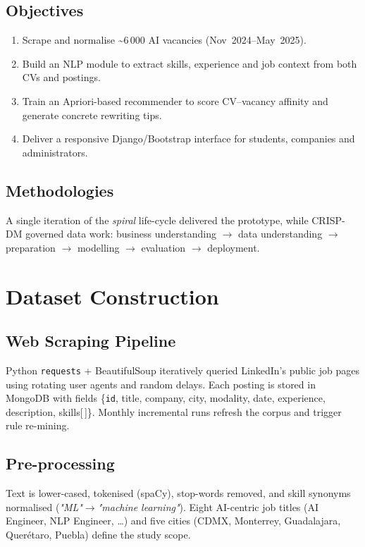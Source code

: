 \documentclass[runningheads]{llncs}
\begin{document}
	\subsection{Objectives}
	\begin{enumerate}[label=\alph*)]
		\item Scrape and normalise \textasciitilde6\,000 AI vacancies (Nov~2024–May~2025).
		\item Build an NLP module to extract skills, experience and job context from both CVs and postings.
		\item Train an Apriori-based recommender to score CV–vacancy affinity and generate concrete rewriting tips.
		\item Deliver a responsive Django/Bootstrap interface for students, companies and administrators.
	\end{enumerate}
	
	\subsection{Methodologies}
	A single iteration of the \emph{spiral} life-cycle delivered the prototype, while CRISP-DM governed data work: business understanding $\rightarrow$ data understanding $\rightarrow$ preparation $\rightarrow$ modelling $\rightarrow$ evaluation $\rightarrow$ deployment.
	
	\section{Dataset Construction}
	\subsection{Web Scraping Pipeline}
	Python \texttt{requests} + BeautifulSoup iteratively queried LinkedIn’s public job pages using rotating user agents and random delays. Each posting is stored in MongoDB with fields \{\texttt{id}, title, company, city, modality, date, experience, description, skills[\,]\}. Monthly incremental runs refresh the corpus and trigger rule re-mining.
	
	\subsection{Pre-processing}
	Text is lower-cased, tokenised (spaCy), stop-words removed, and skill synonyms normalised (\emph{"ML"}$\to$\emph{"machine learning"}). Eight AI-centric job titles (AI Engineer, NLP Engineer, \dots) and five cities (CDMX, Monterrey, Guadalajara, Querétaro, Puebla) define the study scope.
	
\end{document}
